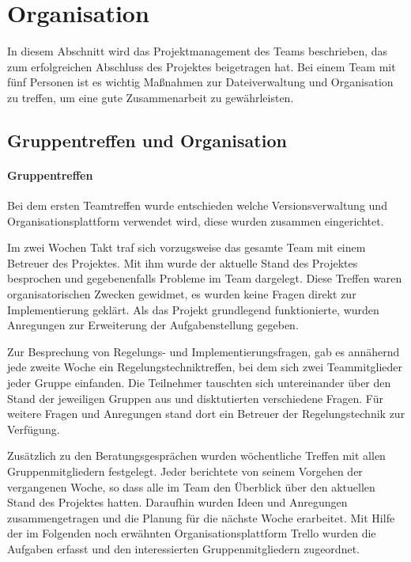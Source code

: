 \section{Organisation}
\label{cha:Organisation}
In diesem Abschnitt wird das Projektmanagement des Teams beschrieben, das zum erfolgreichen Abschluss des Projektes beigetragen hat. Bei einem Team mit fünf Personen ist es wichtig Maßnahmen zur Dateiverwaltung und Organisation zu treffen, um eine gute Zusammenarbeit zu gewährleisten.

\subsection{Gruppentreffen und Organisation}
\label{sec:gruppentreffenundorganisation}

\paragraph{Gruppentreffen}
Bei dem ersten Teamtreffen wurde entschieden welche Versionsverwaltung und Organisationsplattform verwendet wird, diese wurden zusammen eingerichtet.

Im zwei Wochen Takt traf sich vorzugsweise das gesamte Team mit einem Betreuer des Projektes. Mit ihm wurde der aktuelle Stand des Projektes besprochen und gegebenenfalls Probleme im Team dargelegt. Diese Treffen waren organisatorischen Zwecken gewidmet, es wurden keine Fragen direkt zur Implementierung geklärt. Als das Projekt grundlegend funktionierte, wurden Anregungen zur Erweiterung der Aufgabenstellung gegeben. 

Zur Besprechung von Regelungs- und Implementierungsfragen, gab es annähernd jede zweite Woche ein Regelungstechniktreffen, bei dem sich zwei Teammitglieder jeder Gruppe einfanden. Die Teilnehmer tauschten sich untereinander über den Stand der jeweiligen Gruppen aus und disktutierten verschiedene Fragen. Für weitere Fragen und Anregungen stand dort ein Betreuer der Regelungstechnik zur Verfügung.

Zusätzlich zu den Beratungsgesprächen wurden wöchentliche Treffen mit allen Gruppenmitgliedern festgelegt. Jeder berichtete von seinem Vorgehen der vergangenen Woche, so dass alle im Team den Überblick über den aktuellen Stand des Projektes hatten. Daraufhin wurden Ideen und Anregungen zusammengetragen und die Planung für die nächste Woche erarbeitet. Mit Hilfe der im Folgenden noch erwähnten Organisationsplattform Trello wurden die Aufgaben erfasst und den interessierten Gruppenmitgliedern zugeordnet. 

